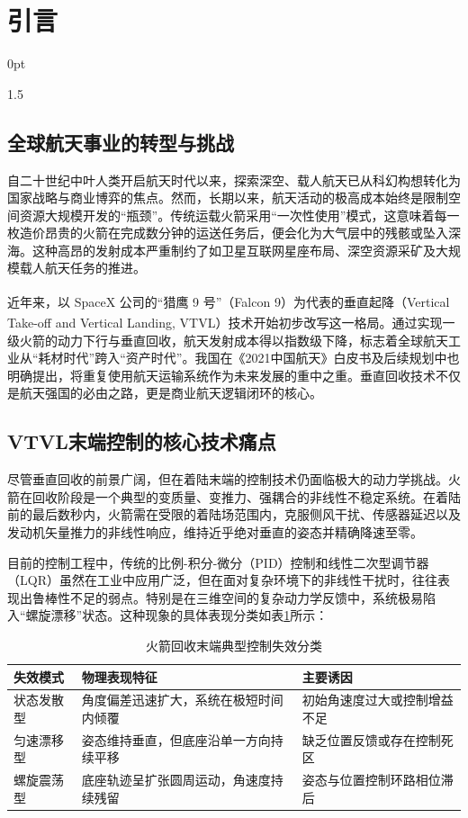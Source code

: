 \documentclass[zihao=-4]{ctexart}
\newcommand{\upcite}[1]{\textsuperscript{\cite{#1}}}
\newcommand{\setParDis}{\setlength {\parskip} {0pt} }
\begin{document}
\section{引言}
\setParDis
\begin{spacing}{1.5}

\subsection{全球航天事业的转型与挑战}
自二十世纪中叶人类开启航天时代以来，探索深空、载人航天已从科幻构想转化为国家战略与商业博弈的焦点。然而，长期以来，航天活动的极高成本始终是限制空间资源大规模开发的“瓶颈”。传统运载火箭采用“一次性使用”模式，这意味着每一枚造价昂贵的火箭在完成数分钟的运送任务后，便会化为大气层中的残骸或坠入深海。这种高昂的发射成本严重制约了如卫星互联网星座布局、深空资源采矿及大规模载人航天任务的推进。

近年来，以 SpaceX 公司的“猎鹰 9 号”（Falcon 9）\upcite{SpaceX2015Falcon9}为代表的垂直起降（Vertical Take-off and Vertical Landing, VTVL）\upcite{Blackmore2016Autonomous}技术开始初步改写这一格局。通过实现一级火箭的动力下行与垂直回收，航天发射成本得以指数级下降，标志着全球航天工业从“耗材时代”跨入“资产时代”。我国在《2021中国航天》白皮书及后续规划中也明确提出，将重复使用航天运输系统作为未来发展的重中之重。垂直回收技术不仅是航天强国的必由之路，更是商业航天逻辑闭环的核心。

\subsection{VTVL末端控制的核心技术痛点}
尽管垂直回收的前景广阔，但在着陆末端的控制技术仍面临极大的动力学挑战。火箭在回收阶段是一个典型的变质量、变推力、强耦合的非线性不稳定系统。在着陆前的最后数秒内，火箭需在受限的着陆场范围内，克服侧风干扰、传感器延迟以及发动机矢量推力的非线性响应，维持近乎绝对垂直的姿态并精确降速至零。

目前的控制工程中，传统的比例-积分-微分（PID）控制和线性二次型调节器（LQR）虽然在工业中应用广泛，但在面对复杂环境下的非线性干扰时，往往表现出鲁棒性不足的弱点。特别是在三维空间的复杂动力学反馈中，系统极易陷入“螺旋漂移”状态。这种现象的具体表现分类如表\ref{tab:control_issues}所示：

\begin{table}[H]
\small
\caption{火箭回收末端典型控制失效分类}
\centering
\begin{tabular}{lp{6cm}l}
\toprule
\textbf{失效模式} & \textbf{物理表现特征} & \textbf{主要诱因} \\ 
\midrule
状态发散型 & 角度偏差迅速扩大，系统在极短时间内倾覆 & 初始角速度过大或控制增益不足 \\
匀速漂移型 & 姿态维持垂直，但底座沿单一方向持续平移 & 缺乏位置反馈或存在控制死区 \\
螺旋震荡型 & 底座轨迹呈扩张圆周运动，角速度持续残留 & 姿态与位置控制环路相位滞后 \\
\bottomrule
\end{tabular} 
\label{tab:control_issues}
\end{table}


\end{spacing}
\end{document}
